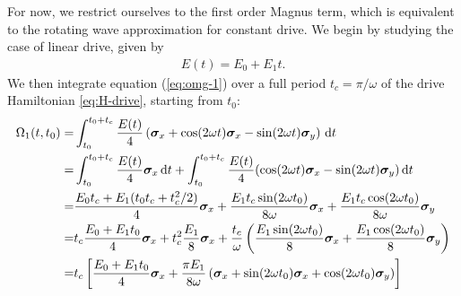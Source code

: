 For now, we restrict ourselves to the first order Magnus term, which is equivalent to the rotating wave approximation for constant drive. We begin by studying the case of linear drive, given by
\begin{align}
	E(t) = E_0 + E_1 t.
\end{align}
We then integrate equation (\ref{eq:omg-1}) over a full period $t_c = \pi / \omega$ of the drive Hamiltonian \ref{eq:H-drive}, starting from $t_0$:
\begin{align*}
	\Omega_1(t,t_0) = &\int_{t_0}^{t_0+t_c} \frac{E(t)}{4}\left( \bm{\sigma}_x + \cos(2 \omega t) \bm{\sigma}_x - \sin(2 \omega t) \bm{\sigma}_y \right) \, \mathrm{d}t \\
	= &\int_{t_0}^{t_0+t_c} \frac{E(t)}{4} \bm{\sigma}_x \, \mathrm{d}t + \int_{t_0}^{t_0+t_c} \frac{E(t)}{4} (\cos(2 \omega t) \bm{\sigma}_x - \sin(2 \omega t) \bm{\sigma}_y) \, \mathrm{d}t\\
	= &\frac{E_0 t_c  + E_1 (t_0 t_c + t_c^2 / 2)}{4} \bm{\sigma}_x + \frac{E_1 t_c \sin(2 \omega t_0)}{8\omega} \bm{\sigma}_x + \frac{E_1 t_c \cos(2 \omega t_0)}{8\omega} \bm{\sigma}_y \\
	= &t_c\frac{E_0 + E_1 t_0}{4} \bm{\sigma}_x + t_c^2 \frac{E_1}{8} \bm{\sigma}_x + \frac{t_c}{\omega} \left( \frac{E_1 \sin(2 \omega t_0)}{8} \bm{\sigma}_x + \frac{E_1 \cos(2 \omega t_0)}{8} \bm{\sigma}_y \right) \\
	= &t_c\left[ \frac{E_0 + E_1 t_0}{4} \bm{\sigma}_x + \frac{\pi E_1}{8 \omega} \left( \bm{\sigma}_x + \sin(2 \omega t_0) \bm{\sigma}_x + \cos(2 \omega t_0) \bm{\sigma}_y \right) \right]
\end{align*}

\printbibliography
	
